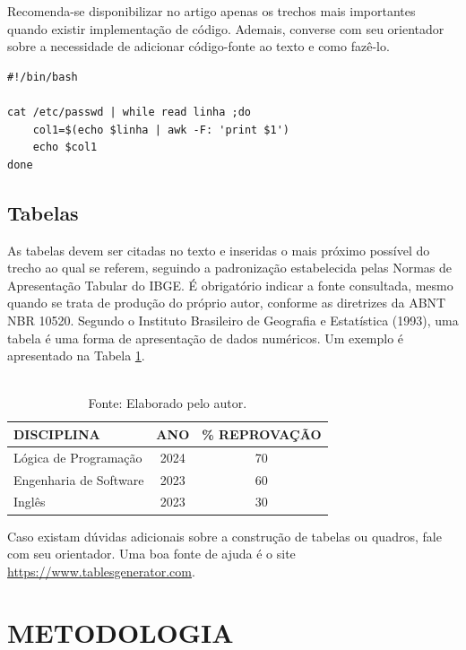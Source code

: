 \documentclass[
	article,
	12pt,
	oneside,
	a4paper,
	english,
	brazil,
	sumario=tradicional
]{abntex2}
\begin{document}
Recomenda-se disponibilizar no artigo apenas os trechos mais importantes quando existir implementação de código. Ademais, converse com seu orientador sobre a necessidade de adicionar código-fonte ao texto e como fazê-lo.

\begin{verbatim}
#!/bin/bash

cat /etc/passwd | while read linha ;do
	col1=$(echo $linha | awk -F: 'print $1') 
	echo $col1
done
\end{verbatim}

\subsection{Tabelas}

As tabelas devem ser citadas no texto e inseridas o mais próximo possível do trecho ao qual se referem, seguindo a padronização estabelecida pelas Normas de Apresentação Tabular do IBGE. É obrigatório indicar a fonte consultada, mesmo quando se trata de produção do próprio autor, conforme as diretrizes da ABNT NBR 10520. Segundo o Instituto Brasileiro de Geografia e Estatística (1993), uma tabela é uma forma de apresentação de dados numéricos. Um exemplo é apresentado na Tabela \ref{tab:clubes}.

\begin{table}[ht]
	\centering
	\caption{Porcentagem de reprovação de diciplinas.}
	\begin{tabular}{l c c}
		\toprule
		DISCIPLINA & ANO & \% REPROVAÇÃO \\ 
		\midrule
		Lógica de Programação            & 2024 & 70 \\
		Engenharia de Software           & 2023 & 60 \\
		Inglês                           & 2023 & 30 \\
		\bottomrule
	\end{tabular}
	\caption*{\\Fonte: Elaborado pelo autor.}
	\label{tab:clubes}
\end{table}

Caso existam dúvidas adicionais sobre a construção de tabelas ou quadros, fale com seu orientador. Uma boa fonte de ajuda é o site \url{https://www.tablesgenerator.com}.

\section{\textbf{METODOLOGIA}}
\end{document}
